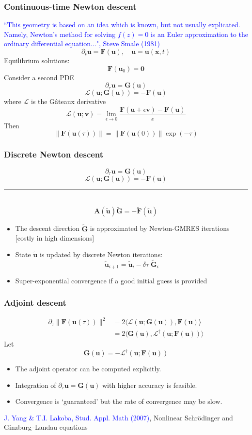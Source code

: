 \documentclass[mathserif]{beamer} %
\newcommand{\vc}{\mathbf}
\begin{document}
%
\begin{frame}
\frametitle{Continuous-time Newton descent}
\tiny{\textcolor{blue}{``This geometry is based on an idea which is known, but not usually explicated. Namely, Newton's method for solving $f(z)=0$ is an Euler approximation to the ordinary differential equation...", Steve Smale (1981)}}
\normalsize
$$\partial_t\vc u =\vc F(\vc u),\quad \vc u=\vc u(\vc x,t)$$
Equilibrium solutions: $$\vc F(\vc u_0)=\vc 0$$
\pause
Consider a second PDE 
$$\partial_\tau \vc u =\vc G(\vc u)$$
$$\pmb{\mathcal L}(\vc u;\vc G(\vc u))=-\vc F(\vc u)$$
where $\pmb{\mathcal L}$ is the G\^ateaux derivative
$$\pmb{\mathcal L}(\vc u;\vc v)=\lim_{\epsilon\to 0}\frac{\vc F(\vc u+\epsilon\vc v)-\vc 
F(\vc u)}{\epsilon}$$
\pause
Then 
$$\|\vc F(\vc u(\tau))\|=\|\vc F(\vc u(0))\|\exp(-\tau)$$
\end{frame}
%
\begin{frame}
\frametitle{Discrete Newton descent}
$$\partial_\tau \vc u =\vc G(\vc u)$$
$$\pmb{\mathcal L}(\vc u;\vc G(\vc u))=-\vc F(\vc u)$$
\hrule\ \\
\pause
$$\vc A(\tilde{\vc u})\tilde{\vc G}=-\tilde{\vc F}(\tilde{\vc u})$$ 
\begin{itemize}
\item
The descent direction $\tilde{\vc G}$ is approximated by Newton-GMRES iterations 
[\alert{costly in high dimensions}]
\pause\item 
State $\tilde{\vc u}$ is updated by discrete Newton iterations:
$$\tilde{\vc u}_{i+1}=\tilde{\vc u}_i -\delta\tau\;\tilde{\vc G}_i$$
\pause\item 
Super-exponential convergence \alert{if a good initial guess is provided}
\end{itemize}
\end{frame}
%
\begin{frame}
\frametitle{Adjoint descent}
\begin{align*}
\partial_\tau\|\vc F(\vc u(\tau))\|^2& =2\langle \pmb{\mathcal L}(\vc u;\vc G(\vc u)),\vc 
F(\vc u)\rangle\\
 & =2\langle \vc G(\vc u),\pmb{\mathcal L}^\dagger(\vc u;\vc F(\vc u))\rangle
\end{align*}
\pause
Let 
$$\vc G(\vc u)=-\pmb{\mathcal L}^\dagger(\vc u;\vc F(\vc u))$$
\begin{itemize}
\pause\item The adjoint operator can be computed explicitly.
\pause\item Integration of $\partial_\tau \vc u=\vc G(\vc u)$ with higher accuracy is 
feasible.
\pause\item Convergence is `guaranteed' but the rate of convergence may be slow.
\end{itemize}
{\tiny\textcolor{blue}{J. Yang \& T.I. Lakoba, Stud. Appl. Math (2007)}, Nonlinear Schr\"odinger and Ginzburg--Landau equations}
\end{frame}
\end{document}

